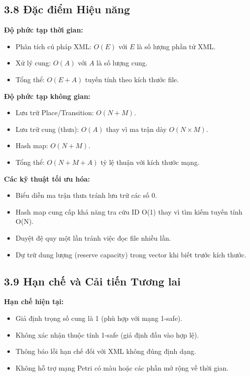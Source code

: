 \documentclass[12pt,a4paper]{article}
\begin{document}
\subsection*{3.8 Đặc điểm Hiệu năng}

\textbf{Độ phức tạp thời gian:}
\begin{itemize}
    \item Phân tích cú pháp XML: $O(E)$ với $E$ là số lượng phần tử XML.
    \item Xử lý cung: $O(A)$ với $A$ là số lượng cung.
    \item Tổng thể: $O(E + A)$ tuyến tính theo kích thước file.
\end{itemize}

\textbf{Độ phức tạp không gian:}
\begin{itemize}
    \item Lưu trữ Place/Transition: $O(N + M)$.
    \item Lưu trữ cung (thưa): $O(A)$ thay vì ma trận dày $O(N \times M)$.
    \item Hash map: $O(N + M)$.
    \item Tổng thể: $O(N + M + A)$ tỷ lệ thuận với kích thước mạng.
\end{itemize}

\textbf{Các kỹ thuật tối ưu hóa:}
\begin{itemize}
    \item Biểu diễn ma trận thưa tránh lưu trữ các số 0.
    \item Hash map cung cấp khả năng tra cứu ID O(1) thay vì tìm kiếm tuyến tính O(N).
    \item Duyệt đệ quy một lần tránh việc đọc file nhiều lần.
    \item Dự trữ dung lượng (reserve capacity) trong vector khi biết trước kích thước.
\end{itemize}

\subsection*{3.9 Hạn chế và Cải tiến Tương lai}

\textbf{Hạn chế hiện tại:}
\begin{itemize}
    \item Giả định trọng số cung là 1 (phù hợp với mạng 1-safe).
    \item Không xác nhận thuộc tính 1-safe (giả định đầu vào hợp lệ).
    \item Thông báo lỗi hạn chế đối với XML không đúng định dạng.
    \item Không hỗ trợ mạng Petri có màu hoặc các phần mở rộng về thời gian.
\end{itemize}
\end{document}

